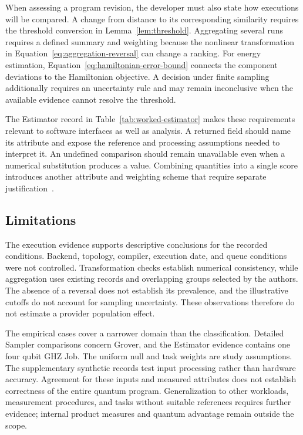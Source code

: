\documentclass[10pt,conference]{IEEEtran}
\begin{document}
When assessing a program revision, the developer must also state how executions will be compared. A change from distance to its corresponding similarity requires the threshold conversion in Lemma~\ref{lem:threshold}. Aggregating several runs requires a defined summary and weighting because the nonlinear transformation in Equation~\ref{eq:aggregation-reversal} can change a ranking. For energy estimation, Equation~\ref{eq:hamiltonian-error-bound} connects the component deviations to the Hamiltonian objective. A decision under finite sampling additionally requires an uncertainty rule and may remain inconclusive when the available evidence cannot resolve the threshold.

The Estimator record in Table~\ref{tab:worked-estimator} makes these requirements relevant to software interfaces as well as analysis. A returned field should name its attribute and expose the reference and processing assumptions needed to interpret it. An undefined comparison should remain unavailable even when a numerical substitution produces a value. Combining quantities into a single score introduces another attribute and weighting scheme that require separate justification~\cite{fentonBieman2015}.

\subsection{Limitations}
\label{sec:threats}

The execution evidence supports descriptive conclusions for the recorded conditions. Backend, topology, compiler, execution date, and queue conditions were not controlled. Transformation checks establish numerical consistency, while aggregation uses existing records and overlapping groups selected by the authors. The absence of a reversal does not establish its prevalence, and the illustrative cutoffs do not account for sampling uncertainty. These observations therefore do not estimate a provider population effect.

The empirical cases cover a narrower domain than the classification. Detailed Sampler comparisons concern Grover, and the Estimator evidence contains one four qubit GHZ Job. The uniform null and task weights are study assumptions. The supplementary synthetic records test input processing rather than hardware accuracy. Agreement for these inputs and measured attributes does not establish correctness of the entire quantum program. Generalization to other workloads, measurement procedures, and tasks without suitable references requires further evidence; internal product measures and quantum advantage remain outside the scope.
\end{document}
